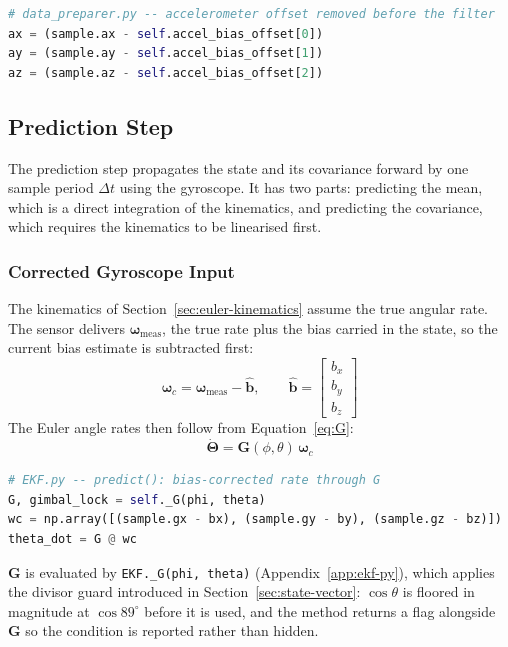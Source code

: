 \documentclass[12pt,a4paper]{article}
\newcommand{\bG}{\bm{G}}
\newcommand{\bomega}{\bm{\omega}}
\newcommand{\bTheta}{\bm{\Theta}}
\begin{document}
{\begin{lstlisting}[language=Python]
# data_preparer.py -- accelerometer offset removed before the filter
ax = (sample.ax - self.accel_bias_offset[0])
ay = (sample.ay - self.accel_bias_offset[1])
az = (sample.az - self.accel_bias_offset[2])
\end{lstlisting}

\subsection{Prediction Step}
\label{sec:predict}

The prediction step propagates the state and its covariance forward
by one sample period $\Delta t$ using the gyroscope. It has two
parts: predicting the mean, which is a direct integration of the
kinematics, and predicting the covariance, which requires the
kinematics to be linearised first.

\subsubsection{Corrected Gyroscope Input}
\label{sec:omega-c}

The kinematics of Section~\ref{sec:euler-kinematics} assume the true
angular rate. The sensor delivers $\bomega_{\text{meas}}$, the true
rate plus the bias carried in the state, so the current bias
estimate is subtracted first:
\begin{equation}
  \bomega_c = \bomega_{\text{meas}} - \hat{\bm{b}}, \qquad
  \hat{\bm{b}} = \begin{bmatrix} b_x \\ b_y \\ b_z \end{bmatrix}
  \label{eq:omega_c}
\end{equation}
The Euler angle rates then follow from Equation~\eqref{eq:G}:
\begin{equation}
  \dot{\bTheta} = \bG(\phi,\theta)\,\bomega_c
  \label{eq:kinematics}
\end{equation}

\begin{lstlisting}[language=Python]
# EKF.py -- predict(): bias-corrected rate through G
G, gimbal_lock = self._G(phi, theta)
wc = np.array([(sample.gx - bx), (sample.gy - by), (sample.gz - bz)])
theta_dot = G @ wc
\end{lstlisting}

$\bG$ is evaluated by \texttt{EKF.\_G(phi, theta)}
(Appendix~\ref{app:ekf-py}), which applies the divisor guard
introduced in Section~\ref{sec:state-vector}: $\cos\theta$ is
floored in magnitude at $\cos 89^{\circ}$ before it is used, and
the method returns a flag alongside $\bG$ so the condition is
reported rather than hidden.

}
\end{document}
